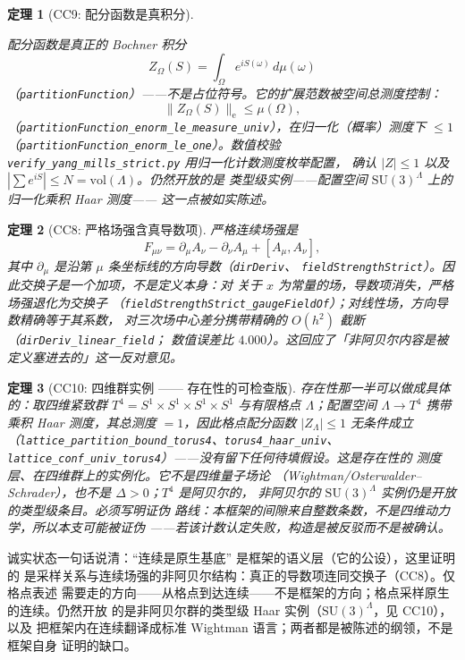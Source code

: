 \documentclass[aps,prd,preprint,superscriptaddress,amsmath,amssymb]{revtex4-2}
\newtheorem{theorem}{定理}[section]
\begin{document}
\begin{theorem}[CC9: 配分函数是真积分]
\label{thm:cc9}
\begin{sloppypar}
配分函数是真正的 Bochner 积分
\[
Z_\Omega(S)=\int_\Omega e^{iS(\omega)}\,d\mu(\omega)
\]
（\texttt{partitionFunction}）——不是占位符号。它的扩展范数被空间总测度控制：
\[
\|Z_\Omega(S)\|_\mathrm{e}\le\mu(\Omega),
\]
（\texttt{partitionFunction\_enorm\_le\_\allowbreak measure\_univ}），在归一化（概率）测度下
$\le 1$
（\texttt{partitionFunction\_enorm\_le\_\allowbreak one}）。数值校验
\texttt{verify\_yang\_mills\_\allowbreak strict.py} 用归一化计数测度枚举配置，
确认 $|Z|\le1$ 以及 $|\sum e^{iS}|\le N=\mathrm{vol}(\Lambda)$。仍然开放的是
类型级实例——配置空间 $\mathrm{SU}(3)^{\Lambda}$ 上的归一化乘积 Haar 测度——
这一点被如实陈述。
\end{sloppypar}
\end{theorem}

\begin{theorem}[CC8: 严格场强含真导数项]
\label{thm:cc8}
严格连续场强是
\[
F_{\mu\nu}=\partial_\mu A_\nu-\partial_\nu A_\mu+[A_\mu,A_\nu],
\]
其中 $\partial_\mu$ 是沿第 $\mu$ 条坐标线的方向导数（\texttt{dirDeriv}、
\texttt{fieldStrengthStrict}）。因此交换子是一个\emph{加项}，不是定义本身：对
关于 $x$ 为常量的场，导数项消失，严格场强退化为交换子
（\texttt{fieldStrengthStrict\_gaugeFieldOf}）；对线性场，方向导数精确等于其系数，
对三次场中心差分携带精确的 $O(h^2)$ 截断（\texttt{dirDeriv\_linear\_field}；
数值误差比 $4.000$）。这回应了「非阿贝尔内容是被定义塞进去的」这一反对意见。
\end{theorem}

\begin{theorem}[CC10: 四维群实例 —— 存在性的可检查版]
\label{thm:cc10}
存在性那一半可以做成具体的：取\emph{四维紧致群}
$T^4=S^1\times S^1\times S^1\times S^1$ 与有限格点 $\Lambda$；配置空间
$\Lambda\to T^4$ 携带乘积 Haar 测度，其总测度 $=1$，因此格点配分函数
$|Z_\Lambda|\le 1$ \emph{无条件成立}
（\texttt{lattice\_partition\_bound\_torus4}、\texttt{torus4\_haar\_univ}、
\texttt{lattice\_conf\_univ\_torus4}）——没有留下任何待填假设。这是存在性的
测度层、在四维群上的实例化。它\emph{不是}四维量子场论
（Wightman/Osterwalder--Schrader），也\emph{不是} $\Delta>0$；$T^4$ 是阿贝尔的，
非阿贝尔的 $\mathrm{SU}(3)^{\Lambda}$ 实例仍是开放的类型级条目。必须写明\emph{证伪}
路线：本框架的间隙来自\emph{整数条数}，不是四维动力学，所以本支\emph{可能被证伪}
——若该计数认定失败，构造是被反驳而不是被确认。
\end{theorem}

诚实状态一句话说清：``连续是原生基底'' 是框架的语义层（它的公设），这里证明的
是采样关系与连续场强的非阿贝尔结构：真正的导数项连同交换子（CC8）。仅格点表述
需要走的方向——从格点到达连续——不是框架的方向；格点采样原生的连续。仍然开放
的是非阿贝尔群的类型级 Haar 实例（$\mathrm{SU}(3)^{\Lambda}$，见 CC10），以及
把框架内在连续翻译成标准 Wightman 语言；两者都是被陈述的纲领，不是框架自身
证明的缺口。
\end{document}
